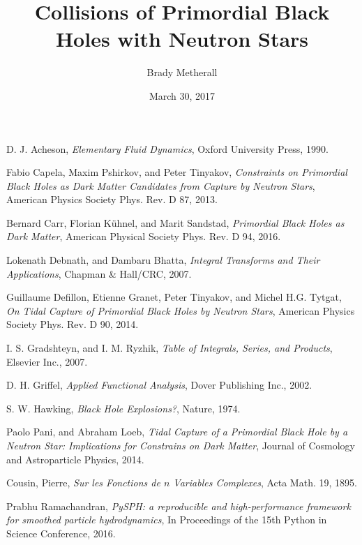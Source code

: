 \documentclass{jthesis}
\title{Collisions of Primordial Black Holes with Neutron Stars} %
\author{Brady Metherall}
\date{March 30, 2017}
\begin{document}
\maketitle



\makedeclaration

\maketableofcontents

\doublespacing
\linespread{2}









\begin{thebibliography}{99}

D. J. Acheson, \emph{Elementary Fluid Dynamics}, Oxford University Press, 1990.

Fabio Capela, Maxim Pshirkov, and Peter Tinyakov, \emph{Constraints on Primordial Black Holes as Dark Matter Candidates from Capture by Neutron Stars}, American Physics Society Phys. Rev. D 87, 2013.

Bernard Carr, Florian K{\"u}hnel, and Marit Sandstad, \emph{Primordial Black Holes as Dark Matter}, American Physical Society Phys. Rev. D 94, 2016.

Lokenath Debnath, and Dambaru Bhatta, \emph{Integral Transforms and Their Applications}, Chapman \& Hall/CRC, 2007.

Guillaume Defillon, Etienne Granet, Peter Tinyakov, and Michel H.G. Tytgat, \emph{On Tidal Capture of Primordial Black Holes by Neutron Stars}, American Physics Society Phys. Rev. D 90, 2014.

I. S. Gradshteyn, and I. M. Ryzhik, \emph{Table of Integrals, Series, and Products}, Elsevier Inc., 2007.

D. H. Griffel, \emph{Applied Functional Analysis}, Dover Publishing Inc., 2002.

S. W. Hawking, \emph{Black Hole Explosions?}, Nature, 1974.

Paolo Pani, and Abraham Loeb, \emph{Tidal Capture of a Primordial Black Hole by a Neutron Star: Implications for Constrains on Dark Matter}, Journal of Cosmology and Astroparticle Physics, 2014.

Cousin, Pierre, \emph{Sur les Fonctions de $n$ Variables Complexes}, Acta Math. 19, 1895.

Prabhu Ramachandran, \emph{PySPH: a reproducible and high-performance framework for smoothed particle hydrodynamics}, In Proceedings of the 15th Python in Science Conference, 2016.




\end{thebibliography}

%
%
\end{document}
